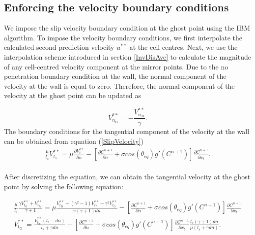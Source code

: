 \documentclass[review]{elsarticle}
\begin{document}
\subsection{Enforcing the velocity boundary conditions}
We impose the slip velocity boundary condition at the ghost point using the IBM algorithm. %
To impose the velocity boundary conditions, we first interpolate the calculated second prediction velocity $u^{**}$ at the cell centres. Next, we use the interpolation scheme 
introduced in section \ref{InvDisAve} to calculate the magnitude of any cell-centred velocity component at the mirror points. Due to the no penetration boundary condition at the wall, the normal component of the velocity at the wall is equal to zero. Therefore, the normal component of the velocity at the ghost point can be updated as
  \begin{linenomath}\begin{equation} \label{NoPenetration}
   V^{**}_{n_G} =  -\frac{V^{**}_{n_M}}{\gamma}.
  \end{equation}
The boundary conditions for the tangential component of the velocity at the wall can be obtained from equation (\ref{SlipVelocity})
\begin{equation} \label{SlipVelocityTangen}
\begin{gathered}
 \frac{\mu}{l_{s}}V^{**}_{t_{s}}= \mu \frac{\partial V^{**}_t}{\partial n}- \left[ \frac{\partial C^{n+1}}{\partial n} + \sigma cos(\theta_{eq}) g'(C^{n+1})\right]\frac{\partial C^{n+1}}{\partial x_t}. \\
 \end{gathered}
\end{equation}\end{linenomath}
After discretizing the equation, we can obtain the tangential velocity at the ghost point by solving the following equation:

\begin{linenomath}\begin{equation} \label{UpdateVtan}
\begin{gathered}
 \frac{\mu}{l_{s}}\frac{\gamma V^{**}_{t_G}+V^{**}_{t_M}}{\gamma+1}= \mu \frac{V^{**}_{t_M}+(\gamma^2-1)V^{**}_{t_I} -\gamma^2 V^{**}_{t_G}}{\gamma(\gamma+1)dn}- \left[ \frac{\partial C^{n+1}}{\partial n} + \sigma cos(\theta_{eq}) g'(C^{n+1})\right]\frac{\partial C^{n+1}}{\partial x_t} \\
 V^{**}_{t_G} = \frac{ V^{**}_{t_m} (l_s-dn)}{l_s+\gamma dn}-  \left[ \frac{\partial C^{n+1}}{\partial n} + \sigma cos(\theta_{eq}) g'(C^{n+1})\right]\frac{\partial C^{n+1}}{\partial x_t} \frac{l_s(\gamma+1)dn }{\mu (l_s+\gamma dn)}.
 \end{gathered}
\end{equation}\end{linenomath}
\end{document}
